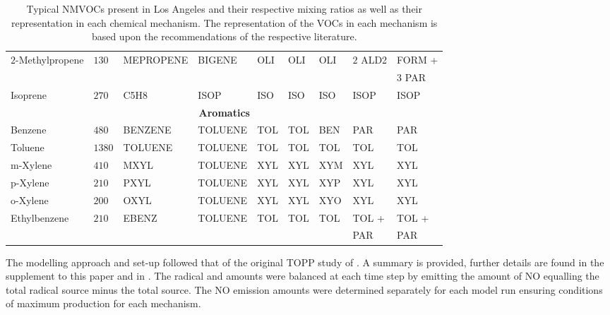 \begin{sidewaystable}
\begin{tabular}{lllllllll}
        \multirow{2}{*}{$2$-Methylpropene} & \multirow{2}{*}{$130$} & \multirow{2}{*}{MEPROPENE} & \multirow{2}{*}{BIGENE} & \multirow{2}{*}{OLI} & \multirow{2}{*}{OLI} & \multirow{2}{*}{OLI} & \multirow{2}{*}{$2$ ALD2} & FORM + \\ & & & & & & & & \hspace{3mm}$3$ PAR \\
        Isoprene & $270$ & C5H8 & ISOP & ISO & ISO & ISO & ISOP & ISOP \\ \hline
        \multicolumn{9}{c}{\textbf{Aromatics}} \\ \hline 
        Benzene & $480$ & BENZENE & TOLUENE & TOL & TOL & BEN & PAR & PAR \\
        Toluene & $1380$ & TOLUENE & TOLUENE & TOL & TOL & TOL & TOL & TOL \\
        m-Xylene & $410$ & MXYL & TOLUENE & XYL & XYL & XYM & XYL & XYL \\
        p-Xylene & $210$ & PXYL & TOLUENE & XYL & XYL & XYP & XYL & XYL \\
        o-Xylene & $200$ & OXYL & TOLUENE & XYL & XYL & XYO & XYL & XYL \\
        \multirow{2}{*}{Ethylbenzene} & \multirow{2}{*}{$210$} & \multirow{2}{*}{EBENZ} & \multirow{2}{*}{TOLUENE} & \multirow{2}{*}{TOL} & \multirow{2}{*}{TOL} & \multirow{2}{*}{TOL} & TOL + & TOL + \\ & & & & & & & \hspace{3mm}PAR & \hspace{3mm}PAR \\ \hline \hline
    \end{tabular}
    \vspace{0mm}
    \caption{Typical NMVOCs present in Los Angeles and their respective mixing ratios \citep{Baker:2008} as well as their representation in each chemical mechanism. The representation of the VOCs in each mechanism is based upon the recommendations of the respective literature.}
    \vspace{-4mm}
    \label{t:initial_conditions}
\end{sidewaystable}

The modelling approach and set-up followed that of the original TOPP study of \citet{Butler:2011}.
A summary is provided, further details are found in the supplement to this paper and in \citet{Butler:2011}. 
The radical and  amounts were balanced at each time step by emitting the amount of NO equalling the total radical source minus the total  source.
The NO emission amounts were determined separately for each model run ensuring conditions of maximum  production for each mechanism.

